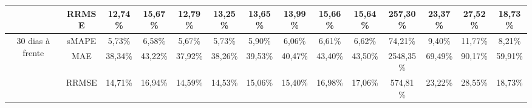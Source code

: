 \begin{landscape}
\begin{table}[!htpb]
\begin{tabular}{@{}cccccccccccccc@{}}
		& RRMSE    & 12,74\%         & 15,67\% & 12,79\%         & 13,25\%         & 13,65\%         & 13,99\%         & 15,66\% & 15,64\% & 257,30\%  & 23,37\% & 27,52\% & 18,73\% \\ \midrule
		\multirow{3}{*}{30 dias à frente} & sMAPE    & 5,73\%          & 6,58\%  & 5,67\%          & 5,73\%          & 5,90\%          & 6,06\%          & 6,61\%  & 6,62\%  & 74,21\%   & 9,40\%  & 11,77\% & 8,21\%  \\
		& MAE      & 38,34\%         & 43,22\% & 37,92\%         & 38,26\%         & 39,53\%         & 40,47\%         & 43,40\% & 43,50\% & 2548,35\% & 69,49\% & 90,17\% & 59,91\% \\
		& RRMSE    & 14,71\%         & 16,94\% & 14,59\%         & 14,53\%         & 15,06\%         & 15,40\%         & 16,98\% & 17,06\% & 574,81\%  & 23,22\% & 28,55\% & 18,73\% \\ \cmidrule(l){1-14} 
	\end{tabular}
		
\end{table}

\newpage


\end{landscape}
